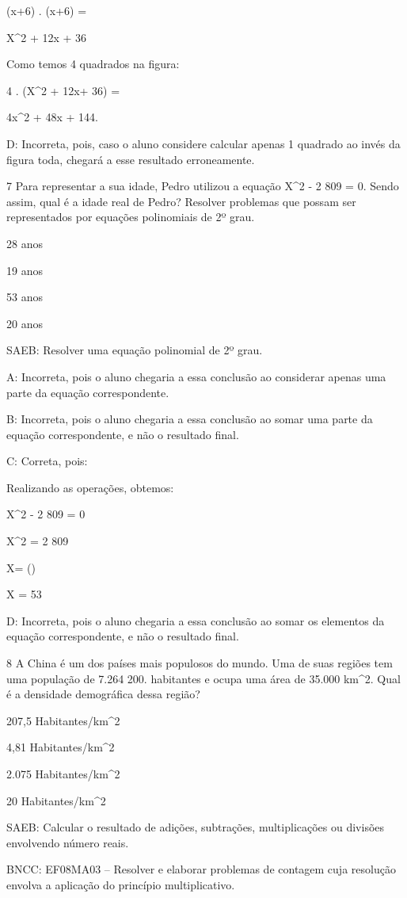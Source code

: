 {(x+6) . (x+6) =

X^2 + 12x + 36

Como temos 4 quadrados na figura:

4 . (X^2 + 12x+ 36) =

4x^2 + 48x + 144.

D: Incorreta, pois, caso o aluno considere calcular apenas 1 quadrado ao
invés da figura toda, chegará a esse resultado erroneamente.

\num{7} Para representar a sua idade, Pedro utilizou a equação X^2 - 2 809 =
0. Sendo assim, qual é a idade real de Pedro? Resolver problemas que
possam ser representados por equações polinomiais de 2º grau.
\item 28 anos
\item 19 anos
\item 53 anos
\item 20 anos

SAEB: Resolver uma equação polinomial de 2º grau.

A: Incorreta, pois o aluno chegaria a essa conclusão ao considerar
apenas uma parte da equação correspondente.

B: Incorreta, pois o aluno chegaria a essa conclusão ao somar uma parte
da equação correspondente, e não o resultado final.

C: Correta, pois:

Realizando as operações, obtemos:

X^2 - 2 809 = 0

X^2 = 2 809

X= ()

X = 53

D: Incorreta, pois o aluno chegaria a essa conclusão ao somar os
elementos da equação correspondente, e não o resultado final.

\num{8} A China é um dos países mais populosos do mundo. Uma de suas regiões
tem uma população de 7.264 200. habitantes e ocupa uma área de 35.000
km^2. Qual é a densidade demográfica dessa região?
\item 207,5 Habitantes/km^2
\item 4,81 Habitantes/km^2
\item 2.075 Habitantes/km^2
\item 20 Habitantes/km^2

SAEB: Calcular o resultado de adições, subtrações, multiplicações ou
divisões envolvendo número reais.

BNCC: EF08MA03 -- Resolver e elaborar problemas de contagem cuja
resolução envolva a aplicação do princípio multiplicativo.

}
